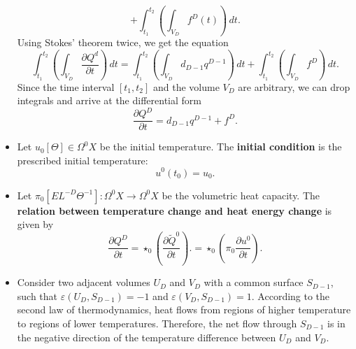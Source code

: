 \begin{discussion}
\begin{itemize}
\begin{equation}
        + \int_{t_1}^{t_2} \left(\int_{V_D} f^D(t) \right)\, d t.
      \end{equation}
      Using Stokes' theorem twice, we get the equation
      \begin{equation}
        \int_{t_1}^{t_2}
          \left(\int_{V_D} \frac{\partial Q^d}{\partial t}\right)\, d t =
          \int_{t_1}^{t_2} \left(\int_{V_D} d_{D - 1} q^{D - 1} \right)\, d t
        + \int_{t_1}^{t_2} \left(\int_{V_D} f^D \right)\, d t.
      \end{equation}
      Since the time interval $[t_1, t_2]$ and the volume $V_D$ are arbitrary,
      we can drop integrals and arrive at the differential form
      \begin{equation}
        \frac{\partial Q^D}{\partial t} = d_{D - 1} q^{D - 1} + f^D.
      \end{equation}
    \item
      Let
        $u_0 [\Theta] \in \Omega^0 X$ be the initial temperature.
      The \textbf{initial condition} is the prescribed initial temperature:
      \begin{equation}
        u^0(t_0) = u_0.
      \end{equation}
    \item
      Let $\pi_0 [E L^{-D} \Theta^{-1}] \colon \Omega^0 X \to \Omega^0 X$
      be the volumetric heat capacity.
      The \textbf{relation between temperature change and heat energy change}
      is given by
      \begin{equation}
        \frac{\partial Q^D}{\partial t}
        = \star_0 \left(\frac{\partial \tilde{Q}^0}{\partial t}\right).
        = \star_0 \left(\pi_0 \frac{\partial u^0}{\partial t}\right).
      \end{equation}
    \item
      Consider two adjacent volumes $U_D$ and $V_D$
      with a common surface $S_{D - 1}$, such that
      $\varepsilon(U_D, S_{D - 1}) = -1$ and
      $\varepsilon(V_D, S_{D - 1}) = 1$.
      According to the second law of thermodynamics, heat flows from regions of
      higher temperature to regions of lower temperatures.
      Therefore, the net flow through $S_{D - 1}$ is in the negative direction
      of the temperature difference between $U_D$ and $V_D$.


\end{itemize}
\end{discussion}
